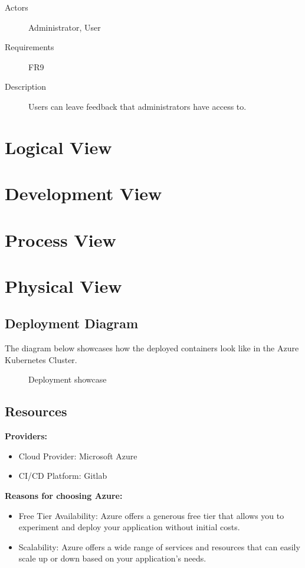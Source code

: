 \documentclass[
    english, %
]{VUMIFPSkursinis}
\begin{document}
\begin{description}
    \item[Actors] Administrator, User
    \item[Requirements] FR9
    \item[Description] Users can leave feedback that administrators have access to.
\end{description}

\section{Logical View}

\section{Development View}

\section{Process View}

\section{Physical View}

\subsection{Deployment Diagram}

The diagram below showcases how the deployed containers look like in the Azure Kubernetes Cluster.

\begin{figure}[ht]
    \centering
    
    \label{deployment-showcase}
    \caption{Deployment showcase}
\end{figure}

\subsection{Resources}

\textbf{Providers:}
\begin{itemize}
    \item Cloud Provider: Microsoft Azure
    \item CI/CD Platform: Gitlab
\end{itemize}

\textbf{Reasons for choosing Azure:}
\begin{itemize}
    \item Free Tier Availability: Azure offers a generous free tier that allows you to experiment and deploy your application without initial costs.
    \item Scalability: Azure offers a wide range of services and resources that can easily scale up or down based on your application's needs.
\end{itemize}
\end{document}
